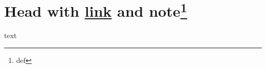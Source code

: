 \section[Head with \href{https://x.org}{link} and note]{Head with \href{https://x.org}{link} and note\footnote{def}}
\label{sec:org109952c}
text
